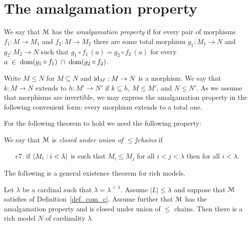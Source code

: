 \documentclass[creche.tex]{subfiles}
\begin{document}
\section{The amalgamation property}

We say that $\EuScript M$ has the \emph{amalgamation property\/} if for every pair of morphisms $f_1:M\to M_1$ and $f_2:M\to M_2$ there are some total morphism $g_1:M_1\to N$ and $g_2:M_2\to N$ such that $g_1\circ f_1\, (a) = g_2\circ f_2\, (a)$ for every $a\;\in\; \mathop{\rm dom} (g_1\circ f_1)\; \cap\; \mathop{\rm dom} (g_2\circ f_2)$.

Write \emph{$M\le N$\/} for $M\subseteq N$ and $\textrm{id}_M:M\to N$ is a morphism. We say that $k:M\to N$ extends to  $h:M'\to N'$ if $k\subseteq h$, $M\le M'$, and  $N\le N'$. As we assume that morphisms are invertible, we may express the amalgamation property in the following convenient form: every morphism extends to a total one.

For the following theorem to hold we need the following property:
\begin{definition}
We say that $\EuScript M$ is \emph{closed under union of $\le\jj$chains\/} if
\begin{itemize}
\item[c7.] if $\langle M_i:i<\lambda\rangle$ is such that $M_i\le M_j$ for all $i<j<\lambda$ then  for all $i<\lambda$.\QED
\end{itemize}
\end{definition}

The following is a general existence theorem for rich models.


\begin{theorem} Let $\lambda$ be a cardinal such that $\lambda=\lambda^{<\lambda}$. Assume $|L|\le\lambda$ and suppose that $\EuScript M$ satisfies  of Definition~\ref{def_com_c}. Assume further that $\EuScript M$ has the amalgamation property and is closed under union of $\le$ chains. Then there is a rich model $N$ of cardinality $\lambda$.
\end{theorem}
\end{document}
